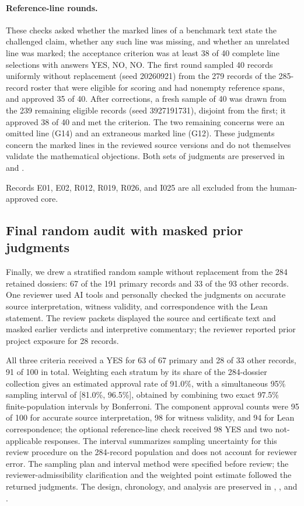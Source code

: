 \paragraph{Reference-line rounds.}
These checks asked whether the marked lines of a benchmark text state the challenged claim, whether any such line was missing, and whether an unrelated line was marked; the acceptance criterion was at least 38 of 40 complete line selections with answers YES, NO, NO. The first round sampled 40 records uniformly without replacement (seed 20260921) from the 279 records of the 285-record roster that were eligible for scoring and had nonempty reference spans, and approved 35 of 40. After corrections, a fresh sample of 40 was drawn from the 239 remaining eligible records (seed 3927191731), disjoint from the first; it approved 38 of 40 and met the criterion. The two remaining concerns were an omitted line (G14) and an extraneous marked line (G12). These judgments concern the marked lines in the reviewed source versions and do not themselves validate the mathematical objections. Both sets of judgments are preserved in  and .

Records E01, E02, R012, R019, R026, and I025 are all excluded from the human-approved core.

\subsection{Final random audit with masked prior judgments}
Finally, we drew a stratified random sample without replacement from the 284 retained dossiers: 67 of the 191 primary records and 33 of the 93 other records. One reviewer used AI tools and personally checked the judgments on accurate source interpretation, witness validity, and correspondence with the Lean statement. The review packets displayed the source and certificate text and masked earlier verdicts and interpretive commentary; the reviewer reported prior project exposure for 28 records.

All three criteria received a YES for 63 of 67 primary and 28 of 33 other records, 91 of 100 in total. Weighting each stratum by its share of the 284-dossier collection gives an estimated approval rate of 91.0\%, with a simultaneous 95\% sampling interval of [81.0\%, 96.5\%], obtained by combining two exact 97.5\% finite-population intervals by Bonferroni. The component approval counts were 95 of 100 for accurate source interpretation, 98 for witness validity, and 94 for Lean correspondence; the optional reference-line check received 98 YES and two not-applicable responses. The interval summarizes sampling uncertainty for this review procedure on the 284-record population and does not account for reviewer error. The sampling plan and interval method were specified before review; the reviewer-admissibility clarification and the weighted point estimate followed the returned judgments. The design, chronology, and analysis are preserved in , , and .

